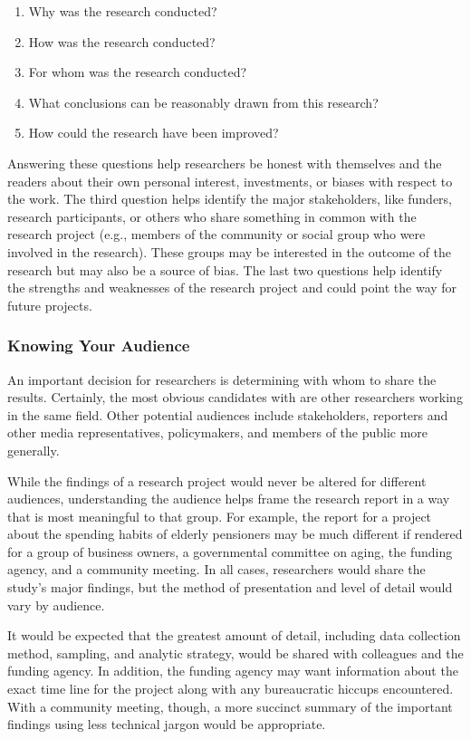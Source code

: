 \begin{enumerate}
	\item Why was the research conducted?
	\item How was the research conducted?
	\item For whom was the research conducted?
	\item What conclusions can be reasonably drawn from this research?
	\item How could the research have been improved?
\end{enumerate}

Answering these questions help researchers be honest with themselves and the readers about their own personal interest, investments, or biases with respect to the work. The third question helps identify the major stakeholders, like funders, research participants, or others who share something in common with the research project (e.g., members of the community or social group who were involved in the research). These groups may be interested in the outcome of the research but may also be a source of bias. The last two questions help identify the strengths and weaknesses of the research project and could point the way for future projects.

\subsubsection{Knowing Your Audience}

An important decision for researchers is determining with whom to share the results. Certainly, the most obvious candidates with are other researchers working in the same field. Other potential audiences include stakeholders, reporters and other media representatives, policymakers, and members of the public more generally.

While the findings of a research project would never be altered for different audiences, understanding the audience helps frame the research report in a way that is most meaningful to that group. For example, the report for a project about the spending habits of elderly pensioners may be much different if rendered for a group of business owners, a governmental committee on aging, the funding agency, and a community meeting. In all cases, researchers would share the study's major findings, but the method of presentation and level of detail would vary by audience.

It would be expected that the greatest amount of detail, including data collection method, sampling, and analytic strategy, would be shared with colleagues and the funding agency. In addition, the funding agency may want information about the exact time line for the project along with any bureaucratic hiccups encountered. With a community meeting, though, a more succinct summary of the important findings using less technical jargon would be appropriate.

